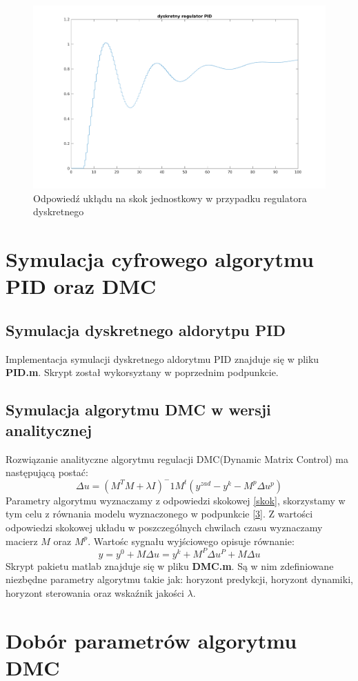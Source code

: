 \documentclass[a4paper, 11pt]{article}
\begin{document}
\begin{figure}[htp]
\centering
\includegraphics[scale=0.60]{2_2.png}
\caption{Odpowiedź ukłądu na skok jednostkowy w przypadku regulatora dyskretnego}
\label{}
\end{figure}

\section{Symulacja cyfrowego algorytmu PID oraz DMC }
\subsection{Symulacja dyskretnego aldorytpu PID}
Implementacja symulacji dyskretnego aldorytmu PID znajduje się w pliku \textbf{PID.m}. Skrypt został wykorsyztany w poprzednim podpunkcie. 
\subsection{Symulacja algorytmu DMC w wersji analitycznej}
 Rozwiązanie analityczne algorytmu regulacji DMC(Dynamic Matrix Control) ma następującą postać: 
 $$\Delta u = (M^TM+\lambda I)^-1M^t(y^{zad}-y^k-M^p\Delta u^p) $$
Parametry algorytmu wyznaczamy z odpowiedzi skokowej \ref{skok}, skorzystamy w tym celu z równania modelu wyznaczonego w podpunkcie \ref{3}. Z wartości odpowiedzi skokowej układu w poszczególnych chwilach czasu wyznaczamy macierz $M$ oraz $M^p$. Wartośc sygnału wyjściowego opisuje równanie: 
$$y = y^0 + M\Delta u = y^k +M^P \Delta u^P + M\Delta u$$
Skrypt pakietu matlab znajduje się w pliku \textbf{DMC.m}. Są w nim zdefiniowane niezbędne parametry algorytmu takie jak: horyzont predykcji, horyzont dynamiki, horyzont sterowania oraz wskaźnik jakości $\lambda$. 
\section{Dobór parametrów algorytmu DMC}
\end{document}
